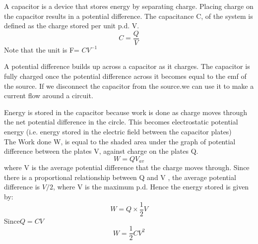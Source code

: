 \documentclass[a4paper]{article}
\begin{document}
\begin{defi}[Capacitors]
A capacitor is a device that stores energy by separating charge. Placing charge on the capacitor results in a potential difference. The capacitance C, of the system is defined as the charge stored per unit p.d. V.
\begin{equation*}
    C=\frac{Q}{V}
\end{equation*}
Note that the unit is F= $CV^{-1}$
\end{defi}

\begin{defi}
A potential difference builds up across a capacitor as it charges. The capacitor is fully charged once the potential difference across it becomes equal to the emf of the source. If we disconnect the capacitor from the source.we can use it to make a current flow around a circuit.
\end{defi}

\begin{defi}
Energy is stored in the capacitor because work is done as charge moves through the net potential difference in the circle. This becomes electrostatic potential energy (i.e. energy stored in the electric field between the capacitor plates)\\

The Work done W, is equal to the shaded area under the graph of potential difference between the plates V, against charge on the plates Q.
\begin{equation*}
    W=QV_{av}
\end{equation*}
where V is the average potential difference that the charge moves through. Since there is a proportional relationship between Q and V , the average potential difference is $V/2$, where V is the maximum p.d. Hence the energy stored is given by:
\begin{equation*}
    W=Q\times \frac{1}{2}V
\end{equation*}
Since$Q=CV$
\begin{equation*}
    W=\frac{1}{2}CV^2
\end{equation*}
\end{defi}
\end{document}
